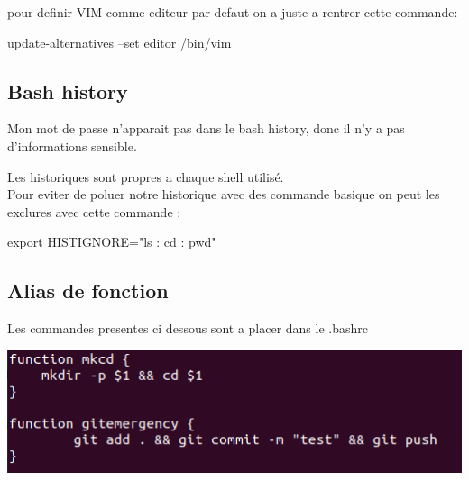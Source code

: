 \documentclass{article}
\begin{document}
 pour definir VIM comme editeur par defaut on a juste a rentrer cette commande: \par update-alternatives --set editor /bin/vim
 
 \subsection{\large{Bash history}}
 
 Mon mot de passe n'apparait pas dans le bash history, donc il n'y a pas d'informations sensible.\par
 Les historiques sont propres a chaque shell utilisé. \\
 
 Pour eviter de poluer notre historique avec des commande basique on peut les exclures avec cette commande : \par
 export HISTIGNORE="ls : cd : pwd"
 
  
  \subsection{\large{Alias de fonction}}
  Les commandes presentes ci dessous sont a placer dans le .bashrc
  
    \begin{center}
        \includegraphics[scale=0.7]{Images/function.png}
    \end{center}
    
 
\end{document}
